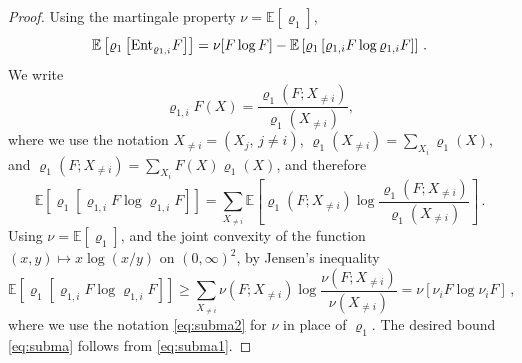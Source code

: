 \documentclass[11pt,reqno]{amsart}
\numberwithin{equation}{section}
\numberwithin{figure}{section}
\newcommand{\ent}{{\rm Ent}}
\newcommand{\1}{\mathds{1}}
\newcommand{\tc}{\,|\,}
\newcommand{\bbE}{{\ensuremath{\mathbb E}} }
\begin{document}
\begin{proof}
Using the martingale property $\nu=\bbE[\varrho_1]$, 
 \begin{equation}\label{eq:subma1}
\bbE\left[\varrho_1\left[\ent_{\varrho_{1,i}}F\right]\right] = \nu[F\log F] - \bbE\left[\varrho_1\left[\varrho_{1,i}F\log \varrho_{1,i}F\right]\right]\,.
\end{equation}
We write %
 \begin{equation}\label{eq:subma2}
 \varrho_{1,i}F (X) = \frac{\varrho_{1}(F;X_{\neq i}) }{\varrho_{1}(X_{\neq i})},
\end{equation}
where we use the notation $X_{\neq i}=(X_j,\,j\neq i)$, $\varrho_{1}(X_{\neq i}) = \sum_{X_i}\varrho_{1}(X)$, and  $\varrho_{1}(F;X_{\neq i}) = \sum_{X_i}F(X)\varrho_{1}(X)$, and therefore 
\[
\bbE\left[\varrho_1\left[\varrho_{1,i}F\log \varrho_{1,i}F\right]\right] = \sum_{X_{\neq i}}\bbE\left[\varrho_{1}(F;X_{\neq i}) \log \frac{\varrho_{1}(F;X_{\neq i}) }{\varrho_{1}(X_{\neq i}) }\right]\,.
\]
Using $\nu=\bbE[\varrho_1]$,  and the joint convexity of the function $(x,y)\mapsto x\log(x/y)$ on $(0,\infty)^2$, by Jensen's inequality 
\[
\bbE\left[\varrho_1\left[\varrho_{1,i}F\log \varrho_{1,i}F\right]\right]\ge \sum_{X_{\neq i}}\nu(F;X_{\neq i}) \log \frac{\nu(F;X_{\neq i}) }{\nu(X_{\neq i}) }= \nu\left[\nu_{i}F\log \nu_{i}F\right]\,,
\]
where we use the notation \eqref{eq:subma2} for $\nu$ in place of $\varrho_1$. The desired bound \eqref{eq:subma} follows from \eqref{eq:subma1}.  
\end{proof}
%
\end{document}
